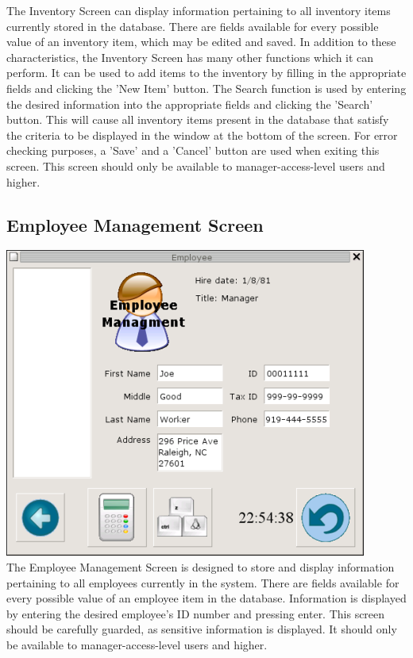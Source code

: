 \documentclass{report}
\begin{document}
\begin{itemize}
    The Inventory Screen can display information pertaining to all
    inventory items currently stored in the database.  There are
    fields available for every possible value of an
    inventory item, which may be edited and saved.  In addition to these
    characteristics, the Inventory Screen has many other functions which it can perform.
    It can be used to add items to the inventory by filling in the
    appropriate fields and clicking the 'New Item' button.  The
    Search function is used by entering the desired information
    into the appropriate fields and clicking the 'Search' button.
    This will cause all inventory items present in the database
    that satisfy the criteria to be displayed in the window at the
    bottom of the screen.  For error checking purposes, a 'Save'
    and a 'Cancel' button are used when exiting this screen.  This
    screen should only be available to manager-access-level users
    and higher.\\

    \subsection{Employee Management Screen}
    \includegraphics{ys_employee_screener.png}\\

    The Employee Management Screen is designed to store and
    display information pertaining to all employees currently in the
    system.  There are fields available for every possible value
    of an employee item in the database.  Information is displayed
    by entering the desired employee's ID number and pressing
    enter.  This screen should be carefully guarded, as sensitive
    information is displayed.  It should only be available to
    manager-access-level users and higher.\\


\end{itemize}
\end{document}
